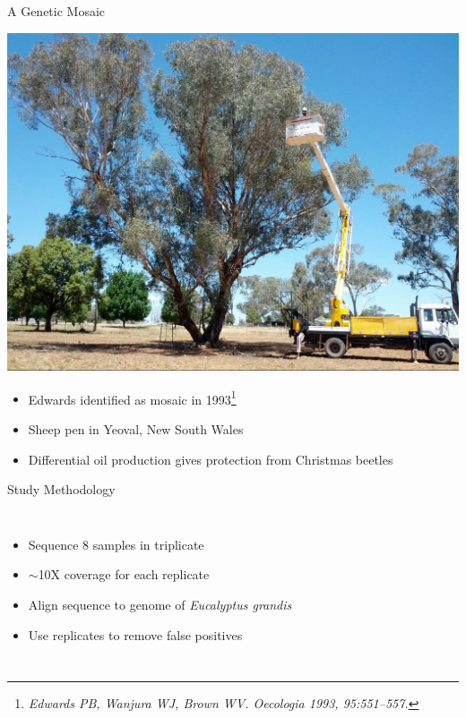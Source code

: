 \documentclass{beamer}
\begin{document}
\begin{frame}{A Genetic Mosaic}
	\begin{center}
	\includegraphics[width=.6\linewidth]{unlabeled_tree.jpg}
	\end{center}
	\begin{itemize}
		\item Edwards identified as mosaic in 1993\footnote{\textit{Edwards PB, Wanjura WJ, Brown WV. Oecologia 1993, 95:551–557.}}
		\item Sheep pen in Yeoval, New South Wales
		\item Differential oil production gives protection from Christmas beetles
	\end{itemize}
\end{frame}


\begin{frame}{Study Methodology}
\begin{columns}

\begin{itemize}
\item Sequence 8 samples in triplicate
\item $\sim$10X coverage for each replicate
\item Align sequence to genome of \textit{Eucalyptus grandis}
\item Use replicates to remove false positives
\end{itemize}

\begin{center}
\end{center}
\end{columns}
\end{frame}
\end{document}
